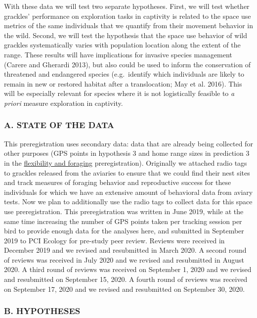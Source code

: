 \documentclass[
]{article}
\begin{document}
With these data we will test two separate hypotheses. First, we will
test whether grackles' performance on exploration tasks in captivity is
related to the space use metrics of the same individuals that we
quantify from their movement behavior in the wild. Second, we will test
the hypothesis that the space use behavior of wild grackles
systematically varies with population location along the extent of the
range. These results will have implications for invasive species
management (Carere and Gherardi 2013), but also could be used to inform
the conservation of threatened and endangered species (e.g.~identify
which individuals are likely to remain in new or restored habitat after
a translocation; May et al. 2016). This will be especially relevant for
species where it is not logistically feasible to \emph{a priori} measure
exploration in captivity.

\hypertarget{a.-state-of-the-data}{%
\subsubsection{A. STATE OF THE DATA}\label{a.-state-of-the-data}}

This preregistration uses secondary data: data that are already being
collected for other purposes (GPS points in hypothesis 3 and home range
sizes in prediction 3 in the
\href{http://corinalogan.com/Preregistrations/g_flexforaging.html}{flexibility
and foraging} preregistration). Originally we attached radio tags to
grackles released from the aviaries to ensure that we could find their
nest sites and track measures of foraging behavior and reproductive
success for these individuals for which we have an extensive amount of
behavioral data from aviary tests. Now we plan to additionally use the
radio tags to collect data for this space use preregistration. This
preregistration was written in June 2019, while at the same time
increasing the number of GPS points taken per tracking session per bird
to provide enough data for the analyses here, and submitted in September
2019 to PCI Ecology for pre-study peer review. Reviews were received in
December 2019 and we revised and resubmitted in March 2020. A second
round of reviews was received in July 2020 and we revised and
resubmitted in August 2020. A third round of reviews was received on
September 1, 2020 and we revised and resubmitted on September 15, 2020.
A fourth round of reviews was received on September 17, 2020 and we
revised and resubmitted on September 30, 2020.

\hypertarget{b.-hypotheses}{%
\subsubsection{B. HYPOTHESES}\label{b.-hypotheses}}
\end{document}
